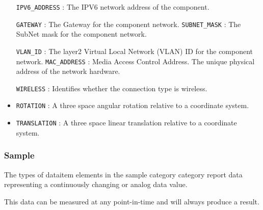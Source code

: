 \begin{itemize}
\newline\tab \texttt{IPV6_ADDRESS} : The IPV6 network address of the component.
 
\newline\tab \texttt{GATEWAY} : The Gateway for the component network. 
\newline\tab \texttt{SUBNET_MASK} : The SubNet mask for the component network.
 
\newline\tab \texttt{VLAN_ID} : The layer2 Virtual Local Network (VLAN) ID for the component network. 
\newline\tab \texttt{MAC_ADDRESS} : Media Access Control Address. The unique physical address of the network hardware.
 
\newline\tab \texttt{WIRELESS} : Identifies whether the connection type is wireless. 
\item \texttt{ROTATION} : A three space angular rotation relative to a coordinate system. 

\item \texttt{TRANSLATION} : A three space linear translation relative to a coordinate system. 

\end{itemize}

\FloatBarrier

\subsubsection{Sample}
  \label{sec:Sample}


The types of \gls{dataitem} elements in the \gls{sample category} category report data representing a continuously changing or analog data value.

This data can be measured at any point-in-time and will always produce a result.



